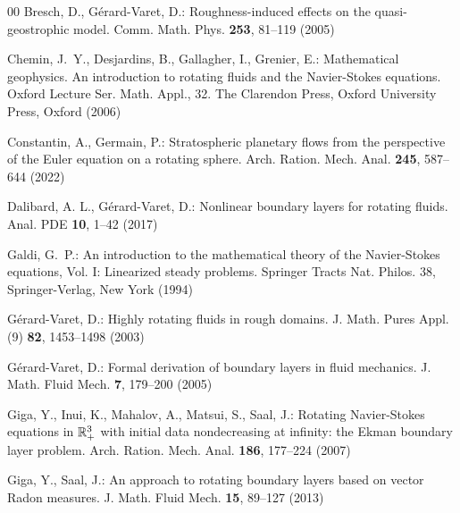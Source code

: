 \documentclass[pdflatex,sn-mathphys-num]{sn-jnl}%
\theoremstyle{thmstyleone}%
\theoremstyle{thmstyletwo}%
\theoremstyle{thmstylethree}%
\theoremstyle{thmstyletwo}
\begin{document}
\begin{thebibliography}{00}
	Bresch, D., G{\'e}rard-Varet, D.: Roughness-induced effects on the quasi-geostrophic model.
	Comm. Math. Phys. \textbf{253}, 81--119 (2005)
	
	
	
	Chemin, J.~Y., Desjardins, B., Gallagher, I., Grenier, E.: Mathematical geophysics. An introduction to rotating fluids and the Navier-Stokes equations.
	Oxford Lecture Ser. Math. Appl., 32. The Clarendon Press, Oxford University Press, Oxford (2006) 
	
	
	
	
	
	 Constantin, A.,  Germain, P.: Stratospheric planetary flows from the perspective of the Euler equation on a rotating sphere. { Arch. Ration. Mech. Anal.} {\bf 245},  587--644 (2022)
	

	
	
	
	
	
  Dalibard, A. L.,  G{\'e}rard-Varet, D.: Nonlinear boundary layers for rotating fluids. {Anal. PDE}  {\bf 10},  1--42 (2017)
	
 

	
	Galdi, G.~P.: An introduction to the mathematical theory of the {Navier}-{Stokes} equations, {Vol}. {I}: {Linearized} steady problems.
	Springer Tracts Nat. Philos. 38, Springer-Verlag, New York (1994) 
	
	
	G{\'e}rard-Varet, D.: Highly rotating fluids in rough domains.
	J. Math. Pures Appl. (9) \textbf{82}, 1453--1498 (2003)
	
    G{\'e}rard-Varet, D.: Formal derivation of boundary  layers in fluid mechanics.
    J. Math. Fluid Mech. \textbf{7}, 179--200 (2005) 
	
	Giga, Y., Inui, K., Mahalov, A., Matsui, S., Saal, J.:
	Rotating Navier-Stokes equations in $\Bbb R_+^3$ with initial data nondecreasing at infinity: the Ekman boundary layer problem. {Arch. Ration. Mech. Anal.} {\bf 186},   177--224 (2007)
	

	
		
	Giga, Y., Saal, J.: An approach to rotating boundary layers based on vector Radon measures. {J. Math. Fluid Mech.} {\bf 15},   89--127  (2013)
	

\end{thebibliography}
\end{document}
